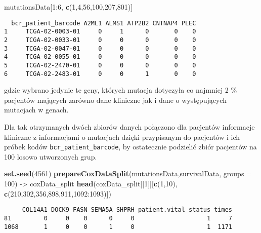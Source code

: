 \documentclass[]{article}
\newenvironment{Shaded}{\begin{snugshade}}{\end{snugshade}}
\newcommand{\KeywordTok}[1]{\textcolor[rgb]{0.13,0.29,0.53}{\textbf{{#1}}}}
\newcommand{\DataTypeTok}[1]{\textcolor[rgb]{0.13,0.29,0.53}{{#1}}}
\newcommand{\DecValTok}[1]{\textcolor[rgb]{0.00,0.00,0.81}{{#1}}}
\newcommand{\StringTok}[1]{\textcolor[rgb]{0.31,0.60,0.02}{{#1}}}
\newcommand{\NormalTok}[1]{{#1}}
\begin{document}
\begin{Shaded}
\begin{Highlighting}[]
\NormalTok{mutationsData[}\DecValTok{1}\NormalTok{:}\DecValTok{6}\NormalTok{, }\KeywordTok{c}\NormalTok{(}\DecValTok{1}\NormalTok{,}\DecValTok{4}\NormalTok{,}\DecValTok{56}\NormalTok{,}\DecValTok{100}\NormalTok{,}\DecValTok{207}\NormalTok{,}\DecValTok{801}\NormalTok{)]}
\end{Highlighting}
\end{Shaded}

\begin{verbatim}
  bcr_patient_barcode A2ML1 ALMS1 ATP2B2 CNTNAP4 PLEC
1     TCGA-02-0003-01     0     1      0       0    0
2     TCGA-02-0033-01     0     0      0       0    0
3     TCGA-02-0047-01     0     0      0       0    0
4     TCGA-02-0055-01     0     0      0       0    0
5     TCGA-02-2470-01     0     0      0       0    0
6     TCGA-02-2483-01     0     0      1       0    0
\end{verbatim}

gdzie wybrano jedynie te geny, których mutacja dotyczyła co najmniej 2
\% pacjentów mających zarówno dane kliniczne jak i dane o występujących
mutacjach w genach.

Dla tak otrzymanych dwóch zbiorów danych połączono dla pacjentów
informacje kliniczne z informacjami o mutacjach dzięki przypisanym do
pacjentów i ich próbek kodów \texttt{bcr\_patient\_barcode}, by
ostatecznie podzielić zbiór pacjentów na 100 losowo utworzonych grup.

\begin{Shaded}
\begin{Highlighting}[]
\KeywordTok{set.seed}\NormalTok{(}\DecValTok{4561}\NormalTok{)}
\KeywordTok{prepareCoxDataSplit}\NormalTok{(mutationsData,survivalData, }\DataTypeTok{groups =} \DecValTok{100}\NormalTok{) ->}\StringTok{ }\NormalTok{coxData_split}
\KeywordTok{head}\NormalTok{(coxData_split[[}\DecValTok{1}\NormalTok{]][}\KeywordTok{c}\NormalTok{(}\DecValTok{1}\NormalTok{,}\DecValTok{10}\NormalTok{), }\KeywordTok{c}\NormalTok{(}\DecValTok{210}\NormalTok{,}\DecValTok{302}\NormalTok{,}\DecValTok{356}\NormalTok{,}\DecValTok{898}\NormalTok{,}\DecValTok{911}\NormalTok{,}\DecValTok{1092}\NormalTok{:}\DecValTok{1093}\NormalTok{)])}
\end{Highlighting}
\end{Shaded}

\begin{verbatim}
     COL14A1 DOCK9 FASN SEMA5A SHPRH patient.vital_status times
81         0     0    0      0     0                    1     7
1068       1     0    0      1     0                    1  1171
\end{verbatim}
\end{document}
